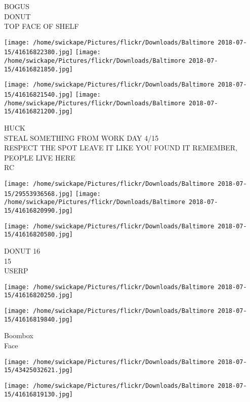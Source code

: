 \documentclass[10pt,letterpaper]{article}
\begin{document}
BOGUS\\
DONUT\\
TOP FACE OF SHELF\\
\pagebreak

\texttt{[image: /home/swickape/Pictures/flickr/Downloads/Baltimore 2018-07-15/41616822380.jpg]}
\texttt{[image: /home/swickape/Pictures/flickr/Downloads/Baltimore 2018-07-15/41616821850.jpg]}

\texttt{[image: /home/swickape/Pictures/flickr/Downloads/Baltimore 2018-07-15/41616821540.jpg]}
\texttt{[image: /home/swickape/Pictures/flickr/Downloads/Baltimore 2018-07-15/41616821200.jpg]}

HUCK\\
STEAL SOMETHING FROM WORK DAY 4/15\\
RESPECT THE SPOT LEAVE IT LIKE YOU FOUND IT REMEMBER, PEOPLE LIVE HERE\\
RC\\
\pagebreak

\texttt{[image: /home/swickape/Pictures/flickr/Downloads/Baltimore 2018-07-15/29553936568.jpg]}
\texttt{[image: /home/swickape/Pictures/flickr/Downloads/Baltimore 2018-07-15/41616820990.jpg]}

\vspace{0.25in}
\texttt{[image: /home/swickape/Pictures/flickr/Downloads/Baltimore 2018-07-15/41616820580.jpg]}

DONUT 16\\
15\\
USERP\\
\pagebreak

\texttt{[image: /home/swickape/Pictures/flickr/Downloads/Baltimore 2018-07-15/41616820250.jpg]}

\vspace{0.25in}
\texttt{[image: /home/swickape/Pictures/flickr/Downloads/Baltimore 2018-07-15/41616819840.jpg]}

Boombox\\
Face\\
\pagebreak

\texttt{[image: /home/swickape/Pictures/flickr/Downloads/Baltimore 2018-07-15/43425032621.jpg]}

\vspace{0.25in}
\texttt{[image: /home/swickape/Pictures/flickr/Downloads/Baltimore 2018-07-15/41616819130.jpg]}
\end{document}
